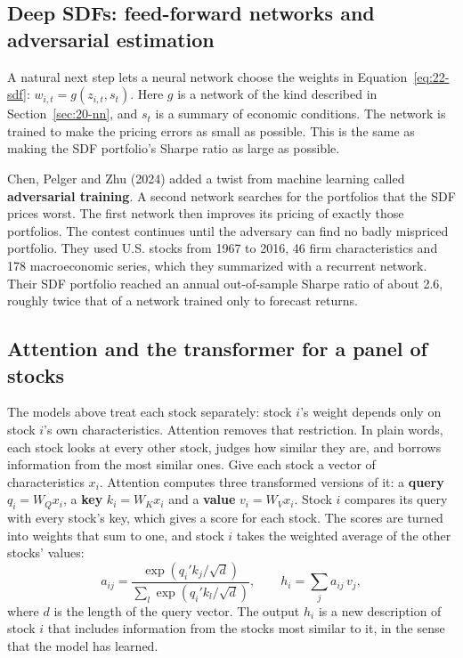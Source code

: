 \subsection{Deep SDFs: feed-forward networks and adversarial estimation}

A natural next step lets a neural network choose the weights in Equation~\eqref{eq:22-sdf}: $w_{i,t} = g(z_{i,t}, s_t)$. Here $g$ is a network of the kind described in Section~\ref{sec:20-nn}, and $s_t$ is a summary of economic conditions. The network is trained to make the pricing errors as small as possible. This is the same as making the SDF portfolio's Sharpe ratio as large as possible.

Chen, Pelger and Zhu (2024) added a twist from machine learning called \textbf{adversarial training}. A second network searches for the portfolios that the SDF prices worst. The first network then improves its pricing of exactly those portfolios. The contest continues until the adversary can find no badly mispriced portfolio. They used U.S. stocks from 1967 to 2016, 46 firm characteristics and 178 macroeconomic series, which they summarized with a recurrent network. Their SDF portfolio reached an annual out-of-sample Sharpe ratio of about 2.6, roughly twice that of a network trained only to forecast returns.

\subsection{Attention and the transformer for a panel of stocks}

The models above treat each stock separately: stock $i$'s weight depends only on stock $i$'s own characteristics. Attention removes that restriction. In plain words, each stock looks at every other stock, judges how similar they are, and borrows information from the most similar ones. Give each stock a vector of characteristics $x_i$. Attention computes three transformed versions of it: a \textbf{query} $q_i = W_Q x_i$, a \textbf{key} $k_i = W_K x_i$ and a \textbf{value} $v_i = W_V x_i$. Stock $i$ compares its query with every stock's key, which gives a score for each stock. The scores are turned into weights that sum to one, and stock $i$ takes the weighted average of the other stocks' values:
\begin{equation}
  a_{ij} = \frac{\exp\left(q_i' k_j/\sqrt{d}\right)}{\sum_{l} \exp\left(q_i' k_l/\sqrt{d}\right)}, \qquad h_i = \sum_{j} a_{ij}\, v_j,
  \label{eq:22-attention}
\end{equation}
where $d$ is the length of the query vector. The output $h_i$ is a new description of stock $i$ that includes information from the stocks most similar to it, in the sense that the model has learned.

